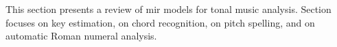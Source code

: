 

This section presents a review of \gls{mir} models for tonal music analysis. Section  focuses on key estimation,  on chord recognition,  on pitch spelling, and  on automatic Roman numeral analysis.

